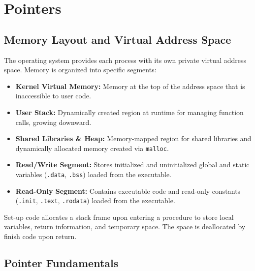 \section{Pointers}

\subsection{Memory Layout and Virtual Address Space}

\begin{definition}
    The operating system provides each process with its own private virtual address space. Memory is organized into specific segments:
    \begin{itemize}
        \item \textbf{Kernel Virtual Memory:} Memory at the top of the address space that is inaccessible to user code.
        \item \textbf{User Stack:} Dynamically created region at runtime for managing function calls, growing downward.
        \item \textbf{Shared Libraries \& Heap:} Memory-mapped region for shared libraries and dynamically allocated memory created via \texttt{malloc}.
        \item \textbf{Read/Write Segment:} Stores initialized and uninitialized global and static variables (\texttt{.data}, \texttt{.bss}) loaded from the executable.
        \item \textbf{Read-Only Segment:} Contains executable code and read-only constants (\texttt{.init}, \texttt{.text}, \texttt{.rodata}) loaded from the executable.
    \end{itemize}
\end{definition}

\begin{remark}
    Set-up code allocates a stack frame upon entering a procedure to store local variables, return information, and temporary space. The space is deallocated by finish code upon return.
\end{remark}

\subsection{Pointer Fundamentals}

